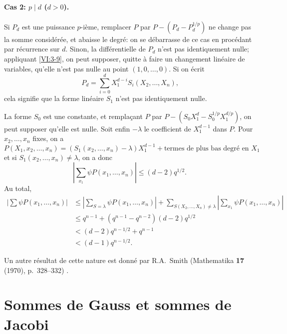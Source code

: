 \paragraph{Cas 2: $p\mid d$ ($d>0$).}
Si $P_d$ est une puissance $p$-ième, remplacer $P$ par $P-(P_d-P_d^{1/p})$ ne 
change pas la somme considérée, et abaisse le degré: on se débarrasse de 
ce cas en procédant par récurrence sur $d$. Sinon, la différentielle de 
$P_d$ n'est pas identiquement nulle; appliquant \ref{VI:3-9}, on peut supposer, 
quitte à faire un changement linéaire de variables, qu'elle n'est pas nulle 
au point $(1,0,\dots,0)$. Si on écrit 
\[
  P_d = \sum_{i=0}^d X_1^{d-i} S_i(X_2,\dots,X_n) \text{,} 
\]
cela signifie que la forme linéaire $S_1$ n'est pas identiquement nulle. 

La forme $S_0$ est une constante, et remplaçant $P$ par 
$P-(S_0 X_1^d -S_0^{1/p} X_1^{d/p})$, on peut supposer qu'elle est nulle. Soit 
enfin $-\lambda$ le coefficient de $X_1^{d-1}$ dans $P$. Pour $x_2,\dots,x_n$ 
fixes, on a 
\[
  P(X_1,x_2,\dots,x_n) = (S_1(x_2,\dots,x_n)-\lambda) X_1^{d-1} + \text{termes de plus bas degré en $X_1$} 
\]
et si $S_1(x_2,\dots,x_n)\ne \lambda$, on a donc 
\[
  \left| \sum_{x_1} \psi P(x_1,\dots,x_n)\right| \leqslant (d-2) q^{1/2} \text{.} 
\]
Au total, 
\begin{align*}
  \left|\sum \psi P(x_1,\dots,x_n)\right| 
    &\leqslant \left|\sum_{S=\lambda} \psi P(x_1,\dots,x_n)\right| + \sum_{S(X_2,\dots,X_n)\ne\lambda} \left| \sum_{x_1} \psi P(x_1,\dots,x_n)\right| \\
    &\leqslant q^{n-1} + (q^{n-1}-q^{n-2})(d-2) q^{1/2} \\
    &< (d-2) q^{n-1/2} + q^{n-1} \\
    &< (d-1) q^{n-1/2} \text{.}
\end{align*}

Un autre résultat de cette nature est donné par R.A.\ Smith 
(Mathematika \textbf{17} (1970), p.~328--332) \cite{sm70}. 










\section{Sommes de Gauss et sommes de Jacobi}\label{VI:4}





\subsection{}\label{VI:4-1}

